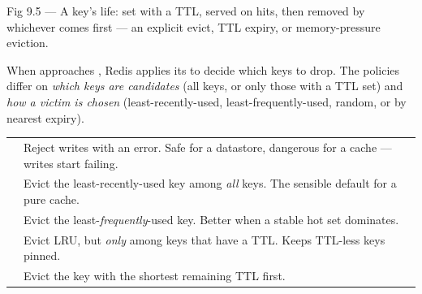 \begin{wbfigure}{Fig 9.5 --- A key's life: set with a TTL, served on hits, then removed by whichever comes first --- an explicit evict, TTL expiry, or memory-pressure eviction.}
\end{wbfigure}

 When  approaches , Redis applies its  to decide which keys to drop. The policies differ on \emph{which keys are candidates} (all keys, or only those with a TTL set) and \emph{how a victim is chosen} (least-recently-used, least-frequently-used, random, or by nearest expiry).

\begin{center}\small
\begin{tabularx}{\linewidth}{@{}L{34mm} X@{}}
 & \\\midrule
{} & Reject writes with an error. Safe for a datastore, dangerous for a cache --- writes start failing.\\
 & Evict the least-recently-used key among \emph{all} keys. The sensible default for a pure cache.\\
 & Evict the least-\emph{frequently}-used key. Better when a stable hot set dominates.\\
 & Evict LRU, but \emph{only} among keys that have a TTL. Keeps TTL-less keys pinned.\\
 & Evict the key with the shortest remaining TTL first.\\
\end{tabularx}\end{center}

